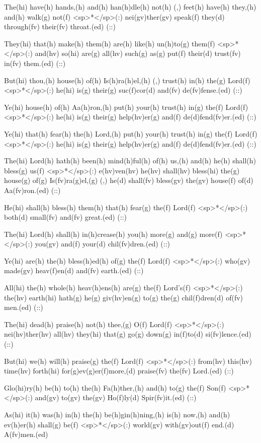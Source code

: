 The(hi) have(h) hands,(h) and(h) han(h)dle(h) not(h) (,) feet(h) have(h) they,(h) and(h) walk(g) not(f) <sp>*</sp>(:) nei(gv)ther(gv) speak(f) they(d) through(fv) their(fv) throat.(ed) (::)

They(hi) that(h) make(h) them(h) are(h) like(h) un(h)to(g) them(f) <sp>*</sp>(:) and(hv) so(hi) are(g) all(hv) such(g) as(g) put(f) their(d) trust(fv) in(fv) them.(ed) (::)

But(hi) thou,(h) house(h) of(h) Is(h)ra(h)el,(h) (,) trust(h) in(h) the(g) Lord(f) <sp>*</sp>(:) he(hi) is(g) their(g) suc(f)cor(d) and(fv) de(fv)fense.(ed) (::)

Ye(hi) house(h) of(h) Aa(h)ron,(h) put(h) your(h) trust(h) in(g) the(f) Lord(f) <sp>*</sp>(:) he(hi) is(g) their(g) help(hv)er(g) and(f) de(d)fend(fv)er.(ed) (::)

Ye(hi) that(h) fear(h) the(h) Lord,(h) put(h) your(h) trust(h) in(g) the(f) Lord(f) <sp>*</sp>(:) he(hi) is(g) their(g) help(hv)er(g) and(f) de(d)fend(fv)er.(ed) (::)

The(hi) Lord(h) hath(h) been(h) mind(h)ful(h) of(h) us,(h) and(h) he(h) shall(h) bless(g) us(f) <sp>*</sp>(:) e(hv)ven(hv) he(hv) shall(hv) bless(hi) the(g) house(g) of(g) Is(fv)ra(g)el,(g) (,) he(d) shall(fv) bless(gv) the(gv) house(f) of(d) Aa(fv)ron.(ed) (::)

He(hi) shall(h) bless(h) them(h) that(h) fear(g) the(f) Lord(f) <sp>*</sp>(:)  both(d) small(fv) and(fv) great.(ed) (::)

The(hi) Lord(h) shall(h) in(h)crease(h) you(h) more(g) and(g) more(f) <sp>*</sp>(:) you(gv) and(f) your(d) chil(fv)dren.(ed) (::)

Ye(hi) are(h) the(h) bless(h)ed(h) of(g) the(f) Lord(f) <sp>*</sp>(:) who(gv) made(gv) heav(f)en(d) and(fv) earth.(ed) (::)

All(hi) the(h) whole(h) heav(h)ens(h) are(g) the(f) Lord's(f) <sp>*</sp>(:) the(hv) earth(hi) hath(g) he(g) giv(hv)en(g) to(g) the(g) chil(f)dren(d) of(fv) men.(ed) (::)

The(hi) dead(h) praise(h) not(h) thee,(g) O(f) Lord(f) <sp>*</sp>(:) nei(hv)ther(hv) all(hv) they(hi) that(g) go(g) down(g) in(f)to(d) si(fv)lence.(ed) (::)

But(hi) we(h) will(h) praise(g) the(f) Lord(f) <sp>*</sp>(:) from(hv) this(hv) time(hv) forth(hi) for(g)ev(g)er(f)more,(d) praise(fv) the(fv) Lord.(ed) (::)

Glo(hi)ry(h) be(h) to(h) the(h) Fa(h)ther,(h) and(h) to(g) the(f) Son(f) <sp>*</sp>(:) and(gv) to(gv) the(gv) Ho(f)ly(d) Spir(fv)it.(ed) (::)

As(hi) it(h) was(h) in(h) the(h) be(h)gin(h)ning,(h) is(h) now,(h) and(h) ev(h)er(h) shall(g) be(f) <sp>*</sp>(:) world(gv) with(gv)out(f) end.(d) A(fv)men.(ed)
